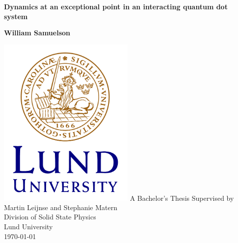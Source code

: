 \documentclass[../main.tex]{subfiles}
\begin{document}
\begin{titlepage}
    \begin{center}
        \vspace*{1cm}
            
        \Huge
        \textbf{Dynamics at an exceptional point in an interacting quantum dot system}
            
        \LARGE
            
        \vspace{1.5cm}
            
        \textbf{William Samuelson}
            
        \vfill

        \includegraphics[width=0.5\textwidth]{figures/LundUniversity_C2line_RGB.png}
        \vfill
        A Bachelor's Thesis
        \vfill            
        \Large
        Supervised by Martin Leijnse and Stephanie Matern\\
        \vfill
        Division of Solid State Physics\\
        Lund University\\
        \today
            
    \end{center}
\end{titlepage}
\end{document}

